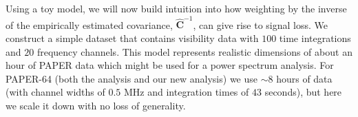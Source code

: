 \documentclass[preprint2,numberedappendix,tighten]{aastex6}  %
\begin{document}
%

Using a toy model, we will now build intuition into how weighting by the inverse of the empirically estimated covariance, $\widehat{\textbf{C}}^{-1}$, can give rise to signal loss.  We construct a simple dataset that contains visibility data with $100$ time integrations and $20$ frequency channels. This model represents realistic dimensions of about an hour of PAPER data which might be used for a power spectrum analysis. For PAPER-64 (both the  analysis and our new analysis) we use $\sim8$ hours of data (with channel widths of $0.5$ MHz and integration times of $43$ seconds), but here we scale it down with no loss of generality. 
\end{document}
